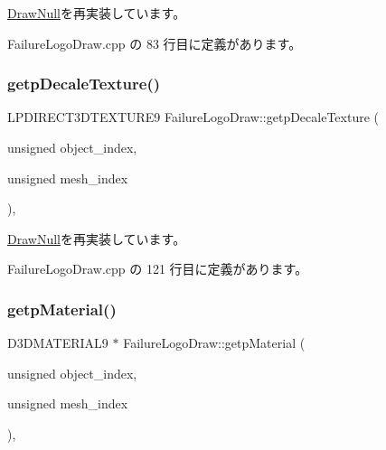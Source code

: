 \mbox{\hyperlink{class_draw_null_a7586cc78eed6bcaf2972ad7a6a70e665}{Draw\+Null}}を再実装しています。



 Failure\+Logo\+Draw.\+cpp の 83 行目に定義があります。

\mbox{\label{class_failure_logo_draw_a29a9642997edb92eeec83e8bd6b1ddee}} 
\subsubsection{\texorpdfstring{getp\+Decale\+Texture()}{getpDecaleTexture()}}
{\footnotesize\ttfamily L\+P\+D\+I\+R\+E\+C\+T3\+D\+T\+E\+X\+T\+U\+R\+E9 Failure\+Logo\+Draw\+::getp\+Decale\+Texture (\begin{DoxyParamCaption}\item[{unsigned}]{object\+\_\+index,  }\item[{unsigned}]{mesh\+\_\+index }\end{DoxyParamCaption})\hspace{0.3cm}{\ttfamily [override]}, {\ttfamily [virtual]}}



\mbox{\hyperlink{class_draw_null_a2dfa2d2cbb66249f933420a38e9cadad}{Draw\+Null}}を再実装しています。



 Failure\+Logo\+Draw.\+cpp の 121 行目に定義があります。

\mbox{\label{class_failure_logo_draw_a60b0cd983365acdad363cdaf8ebdef46}} 
\subsubsection{\texorpdfstring{getp\+Material()}{getpMaterial()}}
{\footnotesize\ttfamily D3\+D\+M\+A\+T\+E\+R\+I\+A\+L9 $\ast$ Failure\+Logo\+Draw\+::getp\+Material (\begin{DoxyParamCaption}\item[{unsigned}]{object\+\_\+index,  }\item[{unsigned}]{mesh\+\_\+index }\end{DoxyParamCaption})\hspace{0.3cm}{\ttfamily [override]}, {\ttfamily [virtual]}}



